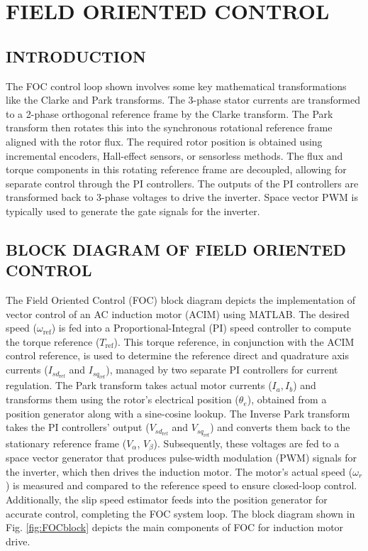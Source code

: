 
\section{\centering FIELD ORIENTED CONTROL}

\subsection{INTRODUCTION}

\hspace{0.2in}The FOC control loop shown involves some key mathematical transformations like the Clarke and Park transforms. The 3-phase stator currents are transformed to a 2-phase orthogonal reference frame by the Clarke transform. The Park transform then rotates this into the synchronous rotational reference frame aligned with the rotor flux. The required rotor position is obtained using incremental encoders, Hall-effect sensors, or sensorless methods. The flux and torque components in this rotating reference frame are decoupled, allowing for separate control through the PI controllers. The outputs of the PI controllers are transformed back to 3-phase voltages to drive the inverter. Space vector PWM is typically used to generate the gate signals for the inverter.
\subsection{BLOCK DIAGRAM OF FIELD ORIENTED CONTROL}

\hspace{0.2in}The Field Oriented Control (FOC) block diagram depicts the implementation of vector control of an AC induction motor (ACIM) using MATLAB. The desired speed ($\omega_{\text{ref}}$) is fed into a Proportional-Integral (PI) speed controller to compute the torque reference ($T_{\text{ref}}$). This torque reference, in conjunction with the ACIM control reference, is used to determine the reference direct and quadrature axis currents ($I_{sd_{\text{ref}}}$ and $I_{sq_{\text{ref}}}$), managed by two separate PI controllers for current regulation. The Park transform takes actual motor currents ($I_a, I_b$) and transforms them using the rotor's electrical position ($\theta_e$), obtained from a position generator along with a sine-cosine lookup. The Inverse Park transform takes the PI controllers' output ($V_{sd_{\text{ref}}}$ and $V_{sq_{\text{ref}}}$) and converts them back to the stationary reference frame ($V_{\alpha}$, $V_{\beta}$). Subsequently, these voltages are fed to a space vector generator that produces pulse-width modulation (PWM) signals for the inverter, which then drives the induction motor. The motor's actual speed ($\omega_r$) is measured and compared to the reference speed to ensure closed-loop control. Additionally, the slip speed estimator feeds into the position generator for accurate control, completing the FOC system loop. The block diagram shown in Fig. \ref{fig:FOCblock} depicts the main components of FOC for induction motor drive.


